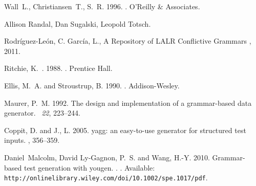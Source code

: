 {\sc Wall~L., Christiansen~T., S.~R.} 1996.
.
\newblock O'Reilly \& Associates.

{\sc Allison Randal, Dan Sugalski, Leopold Totsch.}

{\sc Rodr\'iguez-Le\'on, C. Garc\'ia, L.},
\newblock A Repository of LALR Conflictive Grammars 
, 2011.





{\sc Ritchie, K.~.} 1988.
.
\newblock Prentice Hall.

{\sc Ellis, M.~A.} {\sc and} {\sc Stroustrup, B.} 1990.
.
\newblock Addison-Wesley.
            
{\sc Maurer, P.~M.} 1992.
\newblock The design and implementation of a grammar-based data generator.
~{\em 22}, 223--244.

{\sc Coppit, D.} {\sc and} {\sc J., L.} 2005.
\newblock yagg: an easy-to-use generator for structured test inputs.
, 356--359.

{\sc Daniel~Malcolm, David Ly-Gagnon, P.~S.} {\sc and} {\sc Wang, H.-Y.} 2010.
\newblock Grammar-based test generation with yougen.
.
\newblock [Online]. Available: {\tt
  http://onlinelibrary.wiley.com/doi/10.1002/spe.1017/pdf}.


